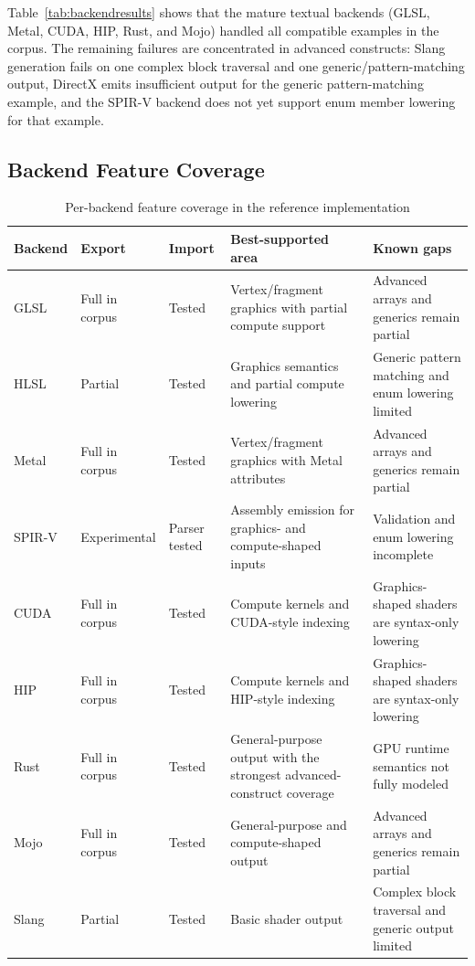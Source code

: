 \documentclass{svproc}
\begin{document}
Table~\ref{tab:backendresults} shows that the mature textual backends (GLSL, Metal, CUDA, HIP, Rust, and Mojo) handled all compatible examples in the corpus. The remaining failures are concentrated in advanced constructs: Slang generation fails on one complex block traversal and one generic/pattern-matching output, DirectX emits insufficient output for the generic pattern-matching example, and the SPIR-V backend does not yet support enum member lowering for that example.

\subsection{Backend Feature Coverage}

\begin{table}[H]
\caption{Per-backend feature coverage in the reference implementation}
\label{tab:featurematrix}
\centering
\scriptsize
\setlength{\tabcolsep}{3pt}
\renewcommand{\arraystretch}{1.06}
\begin{tabularx}{\textwidth}{@{}L{1.25cm}L{1.85cm}L{1.25cm}Y Y@{}}
\toprule
\textbf{Backend} & \textbf{Export} & \textbf{Import} & \textbf{Best-supported area} & \textbf{Known gaps} \\
\midrule
GLSL & Full in corpus & Tested & Vertex/fragment graphics with partial compute support & Advanced arrays and generics remain partial \\
HLSL & Partial & Tested & Graphics semantics and partial compute lowering & Generic pattern matching and enum lowering limited \\
Metal & Full in corpus & Tested & Vertex/fragment graphics with Metal attributes & Advanced arrays and generics remain partial \\
SPIR-V & Experimental & Parser tested & Assembly emission for graphics- and compute-shaped inputs & Validation and enum lowering incomplete \\
CUDA & Full in corpus & Tested & Compute kernels and CUDA-style indexing & Graphics-shaped shaders are syntax-only lowering \\
HIP & Full in corpus & Tested & Compute kernels and HIP-style indexing & Graphics-shaped shaders are syntax-only lowering \\
Rust & Full in corpus & Tested & General-purpose output with the strongest advanced-construct coverage & GPU runtime semantics not fully modeled \\
Mojo & Full in corpus & Tested & General-purpose and compute-shaped output & Advanced arrays and generics remain partial \\
Slang & Partial & Tested & Basic shader output & Complex block traversal and generic output limited \\
\bottomrule
\end{tabularx}
\end{table}
\end{document}
